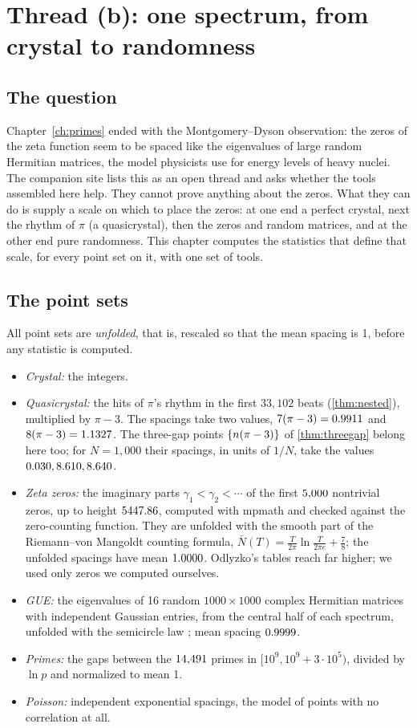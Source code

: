\chapter{Thread (b): one spectrum, from crystal to randomness}\label{ch:spectrum}

\section{The question}

Chapter~\ref{ch:primes} ended with the Montgomery--Dyson observation: the zeros of the zeta function seem to be spaced like the eigenvalues of large random Hermitian matrices, the model physicists use for energy levels of heavy nuclei. The companion site lists this as an open thread and asks whether the tools assembled here help. They cannot prove anything about the zeros. What they can do is supply a scale on which to place the zeros: at one end a perfect crystal, next the rhythm of $\pi$ (a quasicrystal), then the zeros and random matrices, and at the other end pure randomness. This chapter computes the statistics that define that scale, for every point set on it, with one set of tools.

\section{The point sets}

All point sets are \emph{unfolded}, that is, rescaled so that the mean spacing is 1, before any statistic is computed.
\begin{itemize}
\item \emph{Crystal:} the integers.
\item \emph{Quasicrystal:} the hits of $\pi$'s rhythm in the first $33{,}102$ beats (\cref{thm:nested}), multiplied by $\pi - 3$. The spacings take two values, $7(\pi-3) = 0.9911$ and $8(\pi-3) = 1.1327$. The three-gap points $\{n(\pi-3)\}$ of \cref{thm:threegap} belong here too; for $N = 1{,}000$ their spacings, in units of $1/N$, take the values $0.030, 8.610, 8.640$.
\item \emph{Zeta zeros:} the imaginary parts $\gamma_1 < \gamma_2 < \cdots$ of the first $5{,}000$ nontrivial zeros, up to height $5447.86$, computed with mpmath and checked against the zero-counting function. They are unfolded with the smooth part of the Riemann--von Mangoldt counting formula, $\bar N(T) = \frac{T}{2\pi}\ln\frac{T}{2\pi e} + \frac78$; the unfolded spacings have mean $1.0000$. Odlyzko's tables \citep{Odlyzko1987} reach far higher; we used only zeros we computed ourselves.
\item \emph{GUE:} the eigenvalues of 16 random $1000 \times 1000$ complex Hermitian matrices with independent Gaussian entries, from the central half of each spectrum, unfolded with the semicircle law \citep{Mehta2004}; mean spacing $0.9999$.
\item \emph{Primes:} the gaps between the $14{,}491$ primes in $[10^9, 10^9 + 3\cdot 10^5)$, divided by $\ln p$ and normalized to mean 1.
\item \emph{Poisson:} independent exponential spacings, the model of points with no correlation at all.
\end{itemize}

